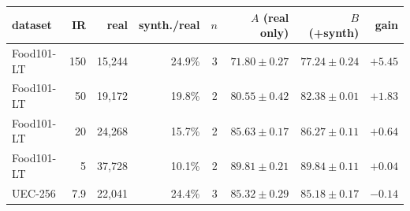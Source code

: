 \begin{tabular}{lrrrrrrr}
\toprule
dataset & IR & real & synth./real & $n$ & $A$ (real only) & $B$ (+synth) & gain \\
\midrule
Food101-LT & 150 & 15,244 & 24.9\% & 3 & $71.80\pm0.27$ & $77.24\pm0.24$ & $+5.45$ \\
Food101-LT & 50 & 19,172 & 19.8\% & 2 & $80.55\pm0.42$ & $82.38\pm0.01$ & $+1.83$ \\
Food101-LT & 20 & 24,268 & 15.7\% & 2 & $85.63\pm0.17$ & $86.27\pm0.11$ & $+0.64$ \\
Food101-LT & 5 & 37,728 & 10.1\% & 2 & $89.81\pm0.21$ & $89.84\pm0.11$ & $+0.04$ \\
\midrule
UEC-256 & 7.9 & 22,041 & 24.4\% & 3 & $85.32\pm0.29$ & $85.18\pm0.17$ & $-0.14$ \\
\bottomrule
\end{tabular}
